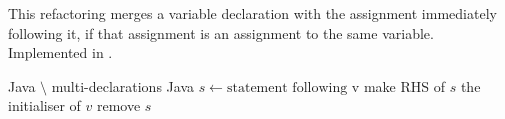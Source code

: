 \subsubsection{}
This refactoring merges a variable declaration with the assignment immediately following it, if that assignment is an assignment to the same variable. Implemented in .

\begin{algorithm}
\caption{$\refactoring{Merge Variable Declaration}(v : \type{LocalVar})$}
\begin{algorithmic}[1]
\REQUIRE Java $\setminus$ multi-declarations
\ENSURE Java
\medskip
{}
  \RETURN
\ENDIF
\STATE $s \leftarrow \text{statement following v}$
  \STATE make RHS of $s$ the initialiser of $v$
  \STATE remove $s$
\ENDIF
\end{algorithmic}
\end{algorithm}
